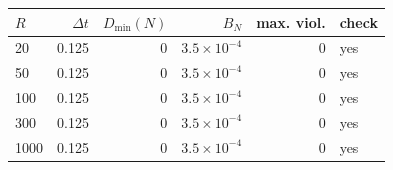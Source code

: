 \begin{tabular}{lrrrrl}
\toprule
$R$ & $\Delta t$ & $D_{\min}(N)$ & $B_N$ & max. viol. & check \\
\midrule
20 & 0.125 & 0 & $3.5\times10^{-4}$ & 0 & yes \\
50 & 0.125 & 0 & $3.5\times10^{-4}$ & 0 & yes \\
100 & 0.125 & 0 & $3.5\times10^{-4}$ & 0 & yes \\
300 & 0.125 & 0 & $3.5\times10^{-4}$ & 0 & yes \\
1000 & 0.125 & 0 & $3.5\times10^{-4}$ & 0 & yes \\
\bottomrule
\end{tabular}
